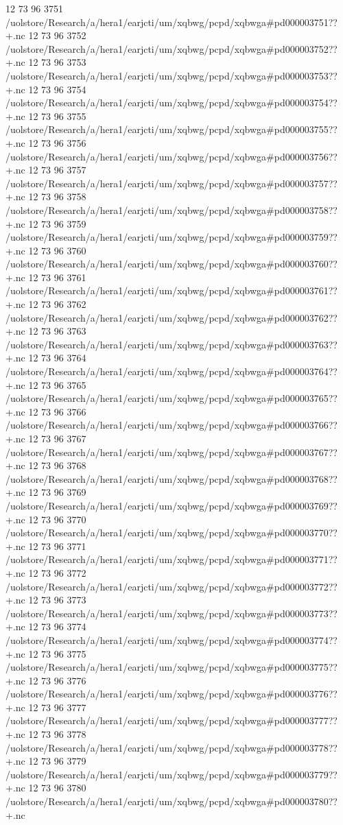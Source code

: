 12 73 96
3751
/uolstore/Research/a/hera1/earjcti/um/xqbwg/pcpd/xqbwga#pd000003751??+.nc
12 73 96
3752
/uolstore/Research/a/hera1/earjcti/um/xqbwg/pcpd/xqbwga#pd000003752??+.nc
12 73 96
3753
/uolstore/Research/a/hera1/earjcti/um/xqbwg/pcpd/xqbwga#pd000003753??+.nc
12 73 96
3754
/uolstore/Research/a/hera1/earjcti/um/xqbwg/pcpd/xqbwga#pd000003754??+.nc
12 73 96
3755
/uolstore/Research/a/hera1/earjcti/um/xqbwg/pcpd/xqbwga#pd000003755??+.nc
12 73 96
3756
/uolstore/Research/a/hera1/earjcti/um/xqbwg/pcpd/xqbwga#pd000003756??+.nc
12 73 96
3757
/uolstore/Research/a/hera1/earjcti/um/xqbwg/pcpd/xqbwga#pd000003757??+.nc
12 73 96
3758
/uolstore/Research/a/hera1/earjcti/um/xqbwg/pcpd/xqbwga#pd000003758??+.nc
12 73 96
3759
/uolstore/Research/a/hera1/earjcti/um/xqbwg/pcpd/xqbwga#pd000003759??+.nc
12 73 96
3760
/uolstore/Research/a/hera1/earjcti/um/xqbwg/pcpd/xqbwga#pd000003760??+.nc
12 73 96
3761
/uolstore/Research/a/hera1/earjcti/um/xqbwg/pcpd/xqbwga#pd000003761??+.nc
12 73 96
3762
/uolstore/Research/a/hera1/earjcti/um/xqbwg/pcpd/xqbwga#pd000003762??+.nc
12 73 96
3763
/uolstore/Research/a/hera1/earjcti/um/xqbwg/pcpd/xqbwga#pd000003763??+.nc
12 73 96
3764
/uolstore/Research/a/hera1/earjcti/um/xqbwg/pcpd/xqbwga#pd000003764??+.nc
12 73 96
3765
/uolstore/Research/a/hera1/earjcti/um/xqbwg/pcpd/xqbwga#pd000003765??+.nc
12 73 96
3766
/uolstore/Research/a/hera1/earjcti/um/xqbwg/pcpd/xqbwga#pd000003766??+.nc
12 73 96
3767
/uolstore/Research/a/hera1/earjcti/um/xqbwg/pcpd/xqbwga#pd000003767??+.nc
12 73 96
3768
/uolstore/Research/a/hera1/earjcti/um/xqbwg/pcpd/xqbwga#pd000003768??+.nc
12 73 96
3769
/uolstore/Research/a/hera1/earjcti/um/xqbwg/pcpd/xqbwga#pd000003769??+.nc
12 73 96
3770
/uolstore/Research/a/hera1/earjcti/um/xqbwg/pcpd/xqbwga#pd000003770??+.nc
12 73 96
3771
/uolstore/Research/a/hera1/earjcti/um/xqbwg/pcpd/xqbwga#pd000003771??+.nc
12 73 96
3772
/uolstore/Research/a/hera1/earjcti/um/xqbwg/pcpd/xqbwga#pd000003772??+.nc
12 73 96
3773
/uolstore/Research/a/hera1/earjcti/um/xqbwg/pcpd/xqbwga#pd000003773??+.nc
12 73 96
3774
/uolstore/Research/a/hera1/earjcti/um/xqbwg/pcpd/xqbwga#pd000003774??+.nc
12 73 96
3775
/uolstore/Research/a/hera1/earjcti/um/xqbwg/pcpd/xqbwga#pd000003775??+.nc
12 73 96
3776
/uolstore/Research/a/hera1/earjcti/um/xqbwg/pcpd/xqbwga#pd000003776??+.nc
12 73 96
3777
/uolstore/Research/a/hera1/earjcti/um/xqbwg/pcpd/xqbwga#pd000003777??+.nc
12 73 96
3778
/uolstore/Research/a/hera1/earjcti/um/xqbwg/pcpd/xqbwga#pd000003778??+.nc
12 73 96
3779
/uolstore/Research/a/hera1/earjcti/um/xqbwg/pcpd/xqbwga#pd000003779??+.nc
12 73 96
3780
/uolstore/Research/a/hera1/earjcti/um/xqbwg/pcpd/xqbwga#pd000003780??+.nc
